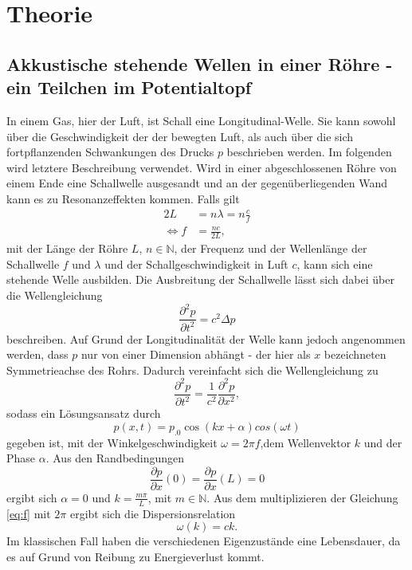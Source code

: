 \section{Theorie}
\label{sec:Theorie}

\subsection{Akkustische stehende Wellen in einer Röhre - ein Teilchen im Potentialtopf}
In einem Gas, hier der Luft, ist Schall eine Longitudinal-Welle. Sie kann sowohl über die Geschwindigkeit der der bewegten Luft, als auch über die sich fortpflanzenden Schwankungen des Drucks $p$ beschrieben werden. Im folgenden wird letztere Beschreibung verwendet.
Wird in einer abgeschlossenen Röhre von einem Ende eine Schallwelle ausgesandt und an der gegenüberliegenden Wand kann es zu Resonanzeffekten kommen. Falls gilt
\begin{align}
2L&=n\lambda=n\frac{c}{f}\\
\Leftrightarrow f&=\frac{n c}{2L},\label{eq:f}
\end{align}
mit der Länge der Röhre $L$, $n\in\mathbb{N}$, der Frequenz und der Wellenlänge der Schallwelle $f$ und $\lambda$ und der Schallgeschwindigkeit in Luft $c$, kann sich eine stehende Welle ausbilden.
Die Ausbreitung der Schallwelle lässt sich dabei über die Wellengleichung
\begin{equation}
\frac{\partial^2 p}{\partial t^2}=c^2\Delta p\label{eq:WGL}
\end{equation}
beschreiben. Auf Grund der Longitudinalität der Welle kann jedoch angenommen werden, dass $p$ nur von einer Dimension abhängt - der hier als $x$ bezeichneten Symmetrieachse des Rohrs. Dadurch vereinfacht sich die Wellengleichung zu
\[
\frac{\partial^2 p}{\partial t^2}=\frac{1}{c^2}\frac{\partial^2 p}{\partial x^2},
\]
sodass ein Lösungsansatz durch
\[
p(x,t)=p_.0\cos(k x +\alpha)cos(\omega t)
\]
gegeben ist, mit der Winkelgeschwindigkeit $\omega=2\pi f$,dem Wellenvektor $k$ und der Phase $\alpha$. Aus den Randbedingungen 
\[
\frac{\partial p}{\partial x}(0)=\frac{\partial p}{\partial x}(L)=0
\]
ergibt sich $\alpha=0$ und $k=\frac{m\pi}{L}$, mit $m\in\mathbb{N}$.
Aus dem multiplizieren der Gleichung \eqref{eq:f} mit $2\pi$ ergibt sich die Dispersionsrelation
\begin{equation}
\omega(k)=c k\text{.}\label{eq:omega_k}
\end{equation}
Im klassischen Fall haben die verschiedenen Eigenzustände eine Lebensdauer, da es auf Grund von Reibung zu Energieverlust kommt.
